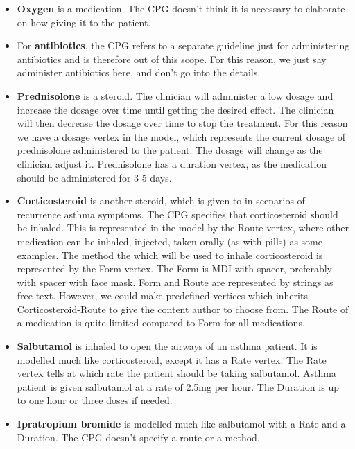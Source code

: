 \begin{itemize}
	\item \textbf{Oxygen} is a medication. The CPG doesn't think it is necessary to elaborate on how giving it to the patient.
	
	\item For \textbf{antibiotics}, the CPG refers to a separate guideline just for administering antibiotics and is therefore out of this scope. For this reason, we just say administer antibiotics here, and don't go into the details.
	
	\item \textbf{Prednisolone} is a steroid. The clinician will administer a low dosage and increase the dosage over time until getting the desired effect. The clinician will then decrease the dosage over time to stop the treatment. For this reason we have a dosage vertex in the model, which represents the current dosage of prednisolone administered to the patient. The dosage will change as the clinician adjust it. Prednisolone has a duration vertex, as the medication should be administered for 3-5 days.
	
	\item \textbf{Corticosteroid} is another steroid, which is given to in scenarios of recurrence asthma symptoms. The CPG specifies that corticosteroid should be inhaled. This is represented in the model by the Route vertex, where other medication can be inhaled, injected, taken orally (as with pills) as some examples. The method the which will be used to inhale corticosteroid is represented by the Form-vertex. The Form is MDI with spacer, preferably with spacer with face mask. Form and Route are represented by strings as free text. However, we could make predefined vertices which inherits Corticosteroid-Route to give the content author to choose from. The Route of a medication is quite limited compared to Form for all medications.
	
	\item \textbf{Salbutamol} is inhaled to open the airways of an asthma patient. It is modelled much like corticosteroid, except it has a Rate vertex. The Rate vertex tells at which rate the patient should be taking salbutamol. Asthma patient is given salbutamol at a rate of 2.5mg per hour. The Duration is up to one hour or three doses if needed.
	
	\item \textbf{Ipratropium bromide} is modelled much like salbutamol with a Rate and a Duration. The CPG doesn't specify a route or a method.
\end{itemize}

